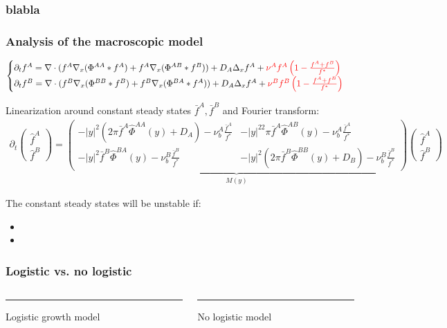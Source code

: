 \documentclass[10pt]{beamer}
\def \p {{\partial}}
\def \bfA {{\bar{f}^A}}
\def \bfB {{\bar{f}^B}}
\def \hPAA {{\hat{\Phi}^{AA}}}
\def \hPBB {{\hat{\Phi}^{BB}}}
\def \hPAB {{\hat{\Phi}^{AB}}}
\def \hPBA {{\hat{\Phi}^{BA}}}
\newcommand\Fontvi{\fontsize{8}{7.2}\selectfont}
\begin{document}
\begin{frame}
\frametitle{blabla}
\end{frame}


\begin{frame}
\frametitle{Analysis of the macroscopic model}
\Fontvi
	\begin{equation}
\begin{cases}
\p_t f^{A}=  \nabla \cdot (f^A\nabla_x(\Phi^{AA}* f^A) + f^A \nabla_x( \Phi^{AB}*f^B)) + D_A \Delta_x f^A + \textcolor{red}{\nu^{A}f^A\left( 1-\frac{f^A+f^B}{f^{*}} \right)} \\

\p_t f^{B}=  \nabla \cdot (f^B\nabla_x(\Phi^{BB}* f^B) + f^B \nabla_x (\Phi^{BA}*f^A)) + D_A \Delta_x f^A + \textcolor{red}{\nu^{B}f^B\left( 1-\frac{f^A+f^B}{f^{*}} \right)}
\end{cases}
\end{equation}

Linearization around constant steady states $\bfA, \bfB$ and Fourier transform:
\begin{align}
\p_t \begin{pmatrix} \hat{f}^A \\ \hat{f}^B
\end{pmatrix}=
\underbrace{\begin{pmatrix} -|y|^2(2\pi\bfA\hPAA(y)+D_A)-\nu_{b}^A\frac{\bfA}{f^*} & -|y|^22\pi\bfA\hPAB(y)-\nu_{b}^A\frac{\bfA}{f^*} \\ 
-|y|^2\bfB\hPBA(y)-\nu_{b}^B\frac{\bfB}{f^*} & -|y|^2(2\pi\bfB\hPBB(y)+D_B)-\nu_{b}^B\frac{\bfB}{f^*} 
\end{pmatrix}}_{M(y)}
\begin{pmatrix} \hat{f}^A \\ \hat{f}^B
\end{pmatrix}
\end{align}

The constant steady states will be unstable if:
\begin{itemize}
	\item 
	\item 
\end{itemize}

\end{frame}



\begin{frame}
\frametitle{Logistic vs. no logistic}
\begin{columns}[T] %
	\begin{column}{.48\textwidth}
		\color{orange}\rule{\linewidth}{4pt}
		
		Logistic growth model
	\end{column}%
	\hfill%
	\begin{column}{.48\textwidth}
		\color{blue}\rule{\linewidth}{4pt}
		
		No logistic model
	\end{column}%
\end{columns}
\end{frame}
\end{document}
